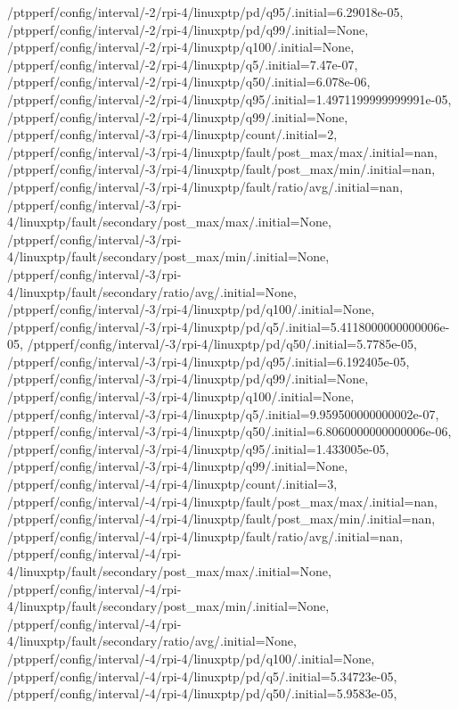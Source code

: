 {    /ptpperf/config/interval/-2/rpi-4/linuxptp/pd/q95/.initial=6.29018e-05,
    /ptpperf/config/interval/-2/rpi-4/linuxptp/pd/q99/.initial=None,
    /ptpperf/config/interval/-2/rpi-4/linuxptp/q100/.initial=None,
    /ptpperf/config/interval/-2/rpi-4/linuxptp/q5/.initial=7.47e-07,
    /ptpperf/config/interval/-2/rpi-4/linuxptp/q50/.initial=6.078e-06,
    /ptpperf/config/interval/-2/rpi-4/linuxptp/q95/.initial=1.4971199999999991e-05,
    /ptpperf/config/interval/-2/rpi-4/linuxptp/q99/.initial=None,
    /ptpperf/config/interval/-3/rpi-4/linuxptp/count/.initial=2,
    /ptpperf/config/interval/-3/rpi-4/linuxptp/fault/post_max/max/.initial=nan,
    /ptpperf/config/interval/-3/rpi-4/linuxptp/fault/post_max/min/.initial=nan,
    /ptpperf/config/interval/-3/rpi-4/linuxptp/fault/ratio/avg/.initial=nan,
    /ptpperf/config/interval/-3/rpi-4/linuxptp/fault/secondary/post_max/max/.initial=None,
    /ptpperf/config/interval/-3/rpi-4/linuxptp/fault/secondary/post_max/min/.initial=None,
    /ptpperf/config/interval/-3/rpi-4/linuxptp/fault/secondary/ratio/avg/.initial=None,
    /ptpperf/config/interval/-3/rpi-4/linuxptp/pd/q100/.initial=None,
    /ptpperf/config/interval/-3/rpi-4/linuxptp/pd/q5/.initial=5.4118000000000006e-05,
    /ptpperf/config/interval/-3/rpi-4/linuxptp/pd/q50/.initial=5.7785e-05,
    /ptpperf/config/interval/-3/rpi-4/linuxptp/pd/q95/.initial=6.192405e-05,
    /ptpperf/config/interval/-3/rpi-4/linuxptp/pd/q99/.initial=None,
    /ptpperf/config/interval/-3/rpi-4/linuxptp/q100/.initial=None,
    /ptpperf/config/interval/-3/rpi-4/linuxptp/q5/.initial=9.959500000000002e-07,
    /ptpperf/config/interval/-3/rpi-4/linuxptp/q50/.initial=6.8060000000000006e-06,
    /ptpperf/config/interval/-3/rpi-4/linuxptp/q95/.initial=1.433005e-05,
    /ptpperf/config/interval/-3/rpi-4/linuxptp/q99/.initial=None,
    /ptpperf/config/interval/-4/rpi-4/linuxptp/count/.initial=3,
    /ptpperf/config/interval/-4/rpi-4/linuxptp/fault/post_max/max/.initial=nan,
    /ptpperf/config/interval/-4/rpi-4/linuxptp/fault/post_max/min/.initial=nan,
    /ptpperf/config/interval/-4/rpi-4/linuxptp/fault/ratio/avg/.initial=nan,
    /ptpperf/config/interval/-4/rpi-4/linuxptp/fault/secondary/post_max/max/.initial=None,
    /ptpperf/config/interval/-4/rpi-4/linuxptp/fault/secondary/post_max/min/.initial=None,
    /ptpperf/config/interval/-4/rpi-4/linuxptp/fault/secondary/ratio/avg/.initial=None,
    /ptpperf/config/interval/-4/rpi-4/linuxptp/pd/q100/.initial=None,
    /ptpperf/config/interval/-4/rpi-4/linuxptp/pd/q5/.initial=5.34723e-05,
    /ptpperf/config/interval/-4/rpi-4/linuxptp/pd/q50/.initial=5.9583e-05,
}
